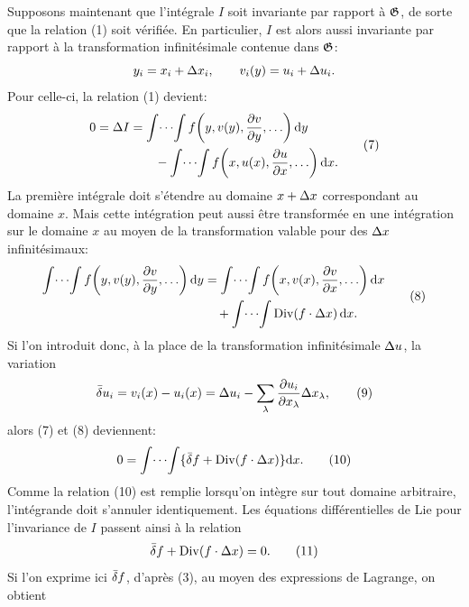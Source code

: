 Supposons maintenant que l'intégrale \(I\) soit invariante par rapport à \(\mathfrak G\), de sorte que la relation (1) soit vérifiée. En particulier, \(I\) est alors aussi invariante par rapport à la transformation infinitésimale contenue dans \(\mathfrak G\):
\[
y_i=x_i+\Delta x_i,\qquad v_i(y)=u_i+\Delta u_i.
\]
Pour celle-ci, la relation (1) devient:
\begin{equation}
\begin{aligned}
0=\Delta I
&=\int\!\cdots\!\int f\!\left(y,v(y),\frac{\partial v}{\partial y},\ldots\right)\mathrm d y\\
&\qquad-\int\!\cdots\!\int f\!\left(x,u(x),\frac{\partial u}{\partial x},\ldots\right)\mathrm d x.
\end{aligned}
\tag{7}
\end{equation}
La première intégrale doit s'étendre au domaine \(x+\Delta x\) correspondant au domaine \(x\). Mais cette intégration peut aussi être transformée en une intégration sur le domaine \(x\) au moyen de la transformation valable pour des \(\Delta x\) infinitésimaux:
\begin{equation}
\begin{aligned}
\int\!\cdots\!\int f\!\left(y,v(y),\frac{\p v}{\p y},\ldots\right)\dd y
&=\int\!\cdots\!\int f\!\left(x,v(x),\frac{\p v}{\p x},\ldots\right)\dd x\\
&\quad+\int\!\cdots\!\int \Div(f\cdot \D x)\,\dd x.
\end{aligned}
\tag{8}
\end{equation}
Si l'on introduit donc, à la place de la transformation infinitésimale \(\Delta u\), la variation
\begin{equation}
\bar{\delta} u_i=v_i(x)-u_i(x)=\Delta u_i-\sum_\lambda\frac{\partial u_i}{\partial x_\lambda}\Delta x_\lambda,
\tag{9}
\end{equation}
alors (7) et (8) deviennent:
\begin{equation}
0=\int\!\cdots\!\int\{\bar{\delta} f+\operatorname{Div}(f\cdot\Delta x)\}\mathrm d x.
\tag{10}
\end{equation}
Comme la relation (10) est remplie lorsqu'on intègre sur tout domaine arbitraire, l'intégrande doit s'annuler identiquement. Les équations différentielles de Lie pour l'invariance de \(I\) passent ainsi à la relation
\begin{equation}
\bar{\delta} f+\operatorname{Div}(f\cdot\Delta x)=0.
\tag{11}
\end{equation}
Si l'on exprime ici \(\bar{\delta} f\), d'après (3), au moyen des expressions de Lagrange, on obtient

